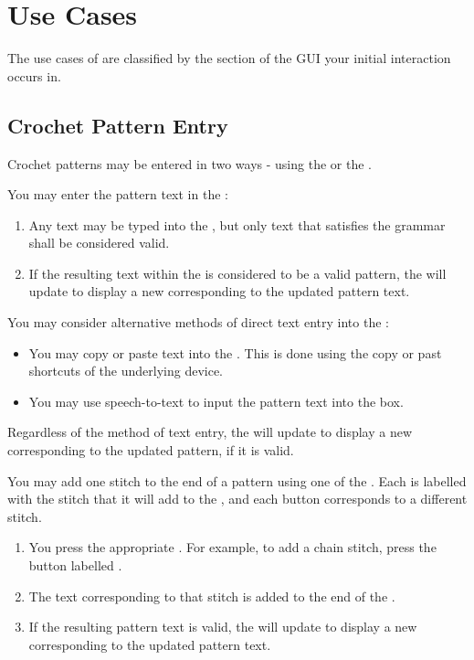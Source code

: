 \documentclass[main.tex]{subfiles}
\begin{document}
\chapter{Use Cases}\label{chp:use}

The use cases of \CC{} are classified by the section of the GUI your initial interaction occurs in.

\section{Crochet Pattern Entry}

Crochet patterns may be entered in two ways - using the \PTI{} or the \ASB.

You may enter the pattern text in the \PTI*:
\begin{enumerate}
\item Any text may be typed into the \PTI, but only text that satisfies the grammar shall be considered valid.
\item If the resulting text within the \PTI{} is considered to be a valid pattern, the \CRW{} will update to display a new \RM{} corresponding to the updated pattern text. 
\end{enumerate}

You may consider alternative methods of direct text entry into the \PTI*:
\begin{itemize}
\item You may copy or paste text into the \PTI. This is done using the copy or past shortcuts of the underlying device.
\item You may use speech-to-text to input the pattern text into the \PTI{} box.
\end{itemize}
Regardless of the method of text entry, the \CRW{} will update to display a new \RM{} corresponding to the updated pattern, if it is valid.


You may add one stitch to the end of a pattern using one of the \ASBs*. Each \ASB{} is labelled with the stitch that it will add to the \RM, and each button corresponds to a different stitch. 

\begin{enumerate}
\item You press the appropriate \ASB. For example, to add a chain stitch, press the button labelled .
\item The text corresponding to that stitch is added to the end of the \PTI.
\item If the resulting pattern text is valid, the \CRW{} will update to display a new \RM{} corresponding to the updated pattern text. 
\end{enumerate}
\end{document}
